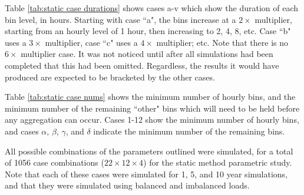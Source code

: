 \documentclass[review,12pt]{elsarticle}
\begin{document}
Table \ref{tab:static case durations} shows cases a-v which show the duration of each bin level, in hours. Starting with case ``a", the bins increase at a $2\times$ multiplier, starting from an hourly level of 1 hour, then increasing to 2, 4, 8, etc. Case ``b" uses a $3\times$ multiplier, case ``c" uses a $4\times$ multiplier; etc. Note that there is no $6\times$ multiplier case. It was not noticed until after all simulations had been completed that this had been omitted. Regardless, the results it would have produced are expected to be bracketed by the other cases.

Table \ref{tab:static case nums} shows the minimum number of hourly bins, and the minimum number of the remaining ``other" bins which will need to be held before any aggregation can occur. Cases 1-12 show the minimum number of hourly bins, and cases $\alpha$, $\beta$, $\gamma$, and $\delta$ indicate the minimum number of the remaining bins.

All possible combinations of the parameters outlined were simulated, for a total of 1056 case combinations ($22 \times 12 \times 4$) for the static method parametric study. Note that each of these cases were simulated for 1, 5, and 10 year simulations, and that they were simulated using balanced and imbalanced loads.
\end{document}
